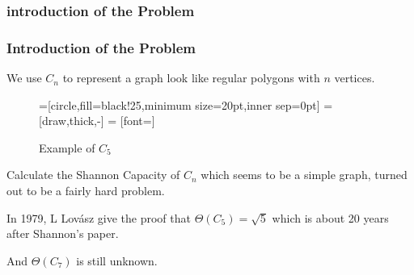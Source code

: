\subsubsection*{introduction of the Problem}

\begin{frame}
      \frametitle{Introduction of the Problem}
      
      We use $C_{n}$ to represent a graph look like regular polygons with $n$ vertices.

      \begin{figure}[h!]
            =[circle,fill=black!25,minimum size=20pt,inner sep=0pt]
             = [draw,thick,-]
             = [font=\small]
            \label{fig:PentagonExample}
            \caption{Example of $C_{5}$}
      \end{figure}

      \pause

      Calculate the Shannon Capacity of $C_{n}$ which seems to be a simple graph, turned out to be a fairly hard problem.
      
      In 1979, L Lovász give the proof that $\Theta(C_{5}) = \sqrt{5}$ which is about 20 years after Shannon's paper.

      And $\Theta(C_{7})$ is still unknown.

\end{frame}